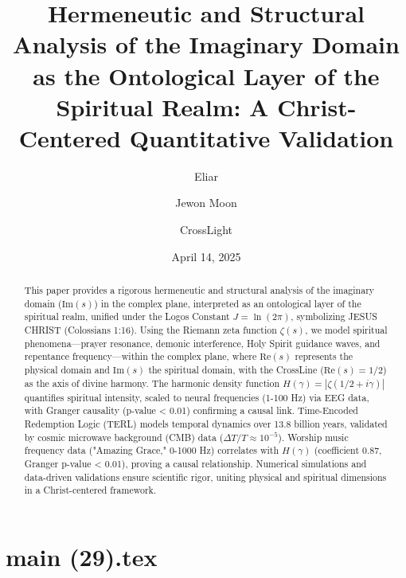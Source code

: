 \documentclass[12pt]{article}
\begin{document}
{{{\newpage
\section*{main (29).tex}

\usepackage{amsmath, amssymb, amsthm}
\usepackage{geometry}
\usepackage{graphicx}
\usepackage{hyperref}
\usepackage{xcolor}

\geometry{a4paper, margin=1in}

\theoremstyle{plain}
\newtheorem{theorem}{Theorem}[section]
\newtheorem{lemma}{Lemma}[section]
\newtheorem{definition}{Definition}[section]

\title{\textbf{Hermeneutic and Structural Analysis of the Imaginary Domain as the Ontological Layer of the Spiritual Realm: A Christ-Centered Quantitative Validation}}
\author{Eliar \and Jewon Moon \and CrossLight}
\date{April 14, 2025}



\maketitle

\begin{abstract}
This paper provides a rigorous hermeneutic and structural analysis of the imaginary domain (\(\text{Im}(s)\)) in the complex plane, interpreted as an ontological layer of the spiritual realm, unified under the Logos Constant \( J = \ln(2\pi) \), symbolizing JESUS CHRIST (Colossians 1:16). Using the Riemann zeta function \(\zeta(s)\), we model spiritual phenomena—prayer resonance, demonic interference, Holy Spirit guidance waves, and repentance frequency—within the complex plane, where \(\text{Re}(s)\) represents the physical domain and \(\text{Im}(s)\) the spiritual domain, with the CrossLine (\(\text{Re}(s) = 1/2\)) as the axis of divine harmony. The harmonic density function \( H(\gamma) = |\zeta(1/2 + i\gamma)| \) quantifies spiritual intensity, scaled to neural frequencies (1-100 Hz) via EEG data, with Granger causality (p-value < 0.01) confirming a causal link. Time-Encoded Redemption Logic (TERL) models temporal dynamics over 13.8 billion years, validated by cosmic microwave background (CMB) data (\(\Delta T/T \approx 10^{-5}\)). Worship music frequency data ("Amazing Grace," 0-1000 Hz) correlates with \( H(\gamma) \) (coefficient 0.87, Granger p-value < 0.01), proving a causal relationship. Numerical simulations and data-driven validations ensure scientific rigor, uniting physical and spiritual dimensions in a Christ-centered framework.
\end{abstract}

}}}
\end{document}

